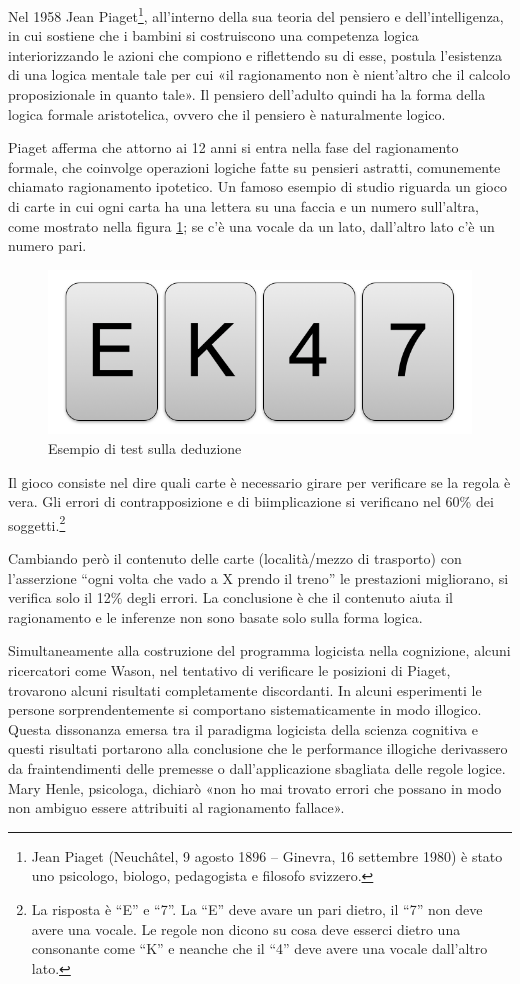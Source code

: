 Nel 1958 Jean Piaget\footnote{Jean Piaget (Neuchâtel, 9 agosto 1896 – Ginevra, 16 settembre 1980) è stato uno psicologo, biologo, pedagogista e filosofo svizzero.}, all'interno della sua teoria del pensiero e dell’intelligenza, in cui sostiene che i bambini si costruiscono una competenza logica interiorizzando le azioni che compiono e riflettendo su di esse, postula l'esistenza di una logica mentale tale per cui «il ragionamento non è nient'altro che il calcolo proposizionale in quanto tale». Il pensiero dell’adulto quindi ha la forma della logica formale aristotelica, ovvero che il pensiero è naturalmente logico.

Piaget afferma che attorno ai 12 anni si entra nella fase del ragionamento formale, che coinvolge operazioni logiche fatte su pensieri astratti, comunemente chiamato ragionamento ipotetico. Un famoso esempio di studio riguarda un gioco di carte in cui ogni carta ha una lettera su una faccia e un numero sull’altra, come mostrato nella figura \ref{fig:deduzione}; se c’è una vocale da un lato, dall’altro lato c’è un numero pari.

\begin{figure}[hbt]
  \centering
  \includegraphics[width=.6\textwidth]{img/ek47.png}
  \caption{Esempio di test sulla deduzione}
  \label{fig:deduzione}
\end{figure}


Il gioco consiste nel dire quali carte è necessario girare per verificare se la regola è vera. Gli errori di contrapposizione e di biimplicazione si verificano nel 60\% dei soggetti.\footnote{La risposta è “E” e “7”. La “E” deve avare un pari dietro, il “7” non deve avere una vocale. Le regole non dicono su cosa deve esserci dietro una consonante come “K” e neanche che il “4” deve avere una vocale dall’altro lato.}

Cambiando però il contenuto delle carte (località/mezzo di trasporto) con l’asserzione “ogni volta che vado a X prendo il treno” le prestazioni migliorano, si verifica solo il 12\% degli errori. La conclusione è che il contenuto aiuta il ragionamento e le inferenze non sono basate solo sulla forma logica.

Simultaneamente alla costruzione del programma logicista nella cognizione, alcuni ricercatori come Wason, nel tentativo di verificare le posizioni di Piaget, trovarono alcuni risultati completamente discordanti. In alcuni esperimenti le persone sorprendentemente si comportano sistematicamente in modo illogico. Questa dissonanza emersa tra il paradigma logicista della scienza cognitiva e questi risultati portarono alla conclusione che le performance illogiche derivassero da fraintendimenti delle premesse o dall’applicazione sbagliata delle regole logice. Mary Henle, psicologa, dichiarò «non ho mai trovato errori che possano in modo non ambiguo essere attribuiti al ragionamento fallace».

